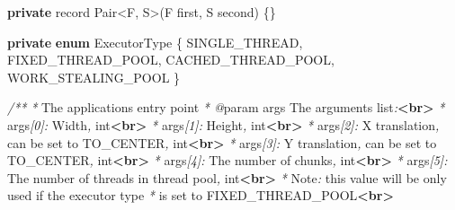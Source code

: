 \documentclass[11pt]{article}
\newenvironment{Shaded}{}{}
\newcommand{\KeywordTok}[1]{\textcolor[rgb]{0.00,0.44,0.13}{\textbf{{#1}}}}
\newcommand{\CommentTok}[1]{\textcolor[rgb]{0.38,0.63,0.69}{\textit{{#1}}}}
\newcommand{\NormalTok}[1]{{#1}}
\newcommand{\OperatorTok}[1]{\textcolor[rgb]{0.40,0.40,0.40}{{#1}}}
\begin{document}
\begin{Shaded}
\begin{Highlighting}[]
    \KeywordTok{private}\NormalTok{ record Pair}\OperatorTok{\textless{}}\NormalTok{F}\OperatorTok{,}\NormalTok{ S}\OperatorTok{\textgreater{}(}\NormalTok{F first}\OperatorTok{,}\NormalTok{ S second}\OperatorTok{)} \OperatorTok{\{\}}

    \KeywordTok{private} \KeywordTok{enum}\NormalTok{ ExecutorType }\OperatorTok{\{}
\NormalTok{        SINGLE\_THREAD}\OperatorTok{,}
\NormalTok{        FIXED\_THREAD\_POOL}\OperatorTok{,}
\NormalTok{        CACHED\_THREAD\_POOL}\OperatorTok{,}
\NormalTok{        WORK\_STEALING\_POOL}
    \OperatorTok{\}}

    \CommentTok{/**}
     \CommentTok{*}\NormalTok{ The application}\CommentTok{\textquotesingle{}}\NormalTok{s entry point}
\CommentTok{     * @}\NormalTok{param args The arguments list}\CommentTok{:}\KeywordTok{\textless{}br\textgreater{}}
     \CommentTok{*}\NormalTok{             args}\CommentTok{[0]:}\NormalTok{ Width}\CommentTok{,} \CommentTok{\textasciigrave{}}\NormalTok{int}\CommentTok{\textasciigrave{}}\KeywordTok{\textless{}br\textgreater{}}
     \CommentTok{*}\NormalTok{             args}\CommentTok{[1]:}\NormalTok{ Height}\CommentTok{,} \CommentTok{\textasciigrave{}}\NormalTok{int}\CommentTok{\textasciigrave{}}\KeywordTok{\textless{}br\textgreater{}}
     \CommentTok{*}\NormalTok{             args}\CommentTok{[2]:}\NormalTok{ X translation}\CommentTok{,}\NormalTok{ can be set to }\CommentTok{\textasciigrave{}}\NormalTok{TO\_CENTER}\CommentTok{\textasciigrave{},} \CommentTok{\textasciigrave{}}\NormalTok{int}\CommentTok{\textasciigrave{}}\KeywordTok{\textless{}br\textgreater{}}
     \CommentTok{*}\NormalTok{             args}\CommentTok{[3]:}\NormalTok{ Y translation}\CommentTok{,}\NormalTok{ can be set to }\CommentTok{\textasciigrave{}}\NormalTok{TO\_CENTER}\CommentTok{\textasciigrave{},} \CommentTok{\textasciigrave{}}\NormalTok{int}\CommentTok{\textasciigrave{}}\KeywordTok{\textless{}br\textgreater{}}
     \CommentTok{*}\NormalTok{             args}\CommentTok{[4]:}\NormalTok{ The number of chunks}\CommentTok{,} \CommentTok{\textasciigrave{}}\NormalTok{int}\CommentTok{\textasciigrave{}}\KeywordTok{\textless{}br\textgreater{}}
     \CommentTok{*}\NormalTok{             args}\CommentTok{[5]:}\NormalTok{ The number of threads in thread pool}\CommentTok{,} \CommentTok{\textasciigrave{}}\NormalTok{int}\CommentTok{\textasciigrave{}}\KeywordTok{\textless{}br\textgreater{}}
     \CommentTok{*}\NormalTok{                      Note}\CommentTok{:}\NormalTok{ this value will be only used if the executor type}
     \CommentTok{*}\NormalTok{                      is set to }\CommentTok{\textasciigrave{}}\NormalTok{FIXED\_THREAD\_POOL}\CommentTok{\textasciigrave{}}\KeywordTok{\textless{}br\textgreater{}}

\end{Highlighting}
\end{Shaded}
\end{document}

